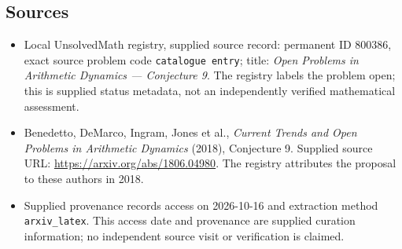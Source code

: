 \documentclass[11pt]{article}
\begin{document}
\subsection{Sources}
\begin{itemize}
\item Local UnsolvedMath registry, supplied source record: permanent ID \(800386\), exact source problem code \texttt{catalogue entry}; title: \emph{Open Problems in Arithmetic Dynamics --- Conjecture 9}. The registry labels the problem open; this is supplied status metadata, not an independently verified mathematical assessment.
\item Benedetto, DeMarco, Ingram, Jones et al., \emph{Current Trends and Open Problems in Arithmetic Dynamics} (2018), Conjecture 9. Supplied source URL: \url{https://arxiv.org/abs/1806.04980}. The registry attributes the proposal to these authors in 2018.
\item Supplied provenance records access on 2026-10-16 and extraction method \texttt{arxiv\_latex}. This access date and provenance are supplied curation information; no independent source visit or verification is claimed.
\end{itemize}
\end{document}
